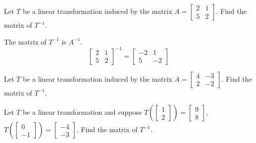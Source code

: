 \documentclass{ximera}
\begin{document}
\begin{problem}\label{prb:6.8} Let $T$ be a linear transformation induced by the matrix $A = \left[ \begin{array}{rr}
2 & 1 \\
5 & 2
\end{array} \right]$. Find the matrix of $T^{-1}$.
\begin{hint}
The matrix of $T^{-1}$ is $A^{-1}$.
\[
\left[ \begin{array}{rr}
2 & 1 \\
5 & 2
\end{array} \right] ^{-1} =
\left[
\begin{array}{rr}
-2 & 1 \\
5 & -2
\end{array}
\right]
\]
\end{hint}
\end{problem}

\begin{problem}\label{prb:6.9} Let $T$ be a linear transformation induced by the matrix $A = \left[ \begin{array}{rr}
4 & -3 \\
2 & -2
\end{array} \right]$. Find the matrix of $T^{-1}$.
\end{problem}

\begin{problem}\label{prb:6.10} Let $T$ be a linear transformation and suppose $T \left( \left[ \begin{array}{r}
1 \\
2
\end{array}\right] \right) = \left[ \begin{array}{r}
9 \\
8
\end{array} \right]$, $T \left( \left[ \begin{array}{r}
0 \\
-1
\end{array}\right] \right) = \left[ \begin{array}{r}
-4 \\
-3
\end{array}\right]$.
Find the matrix of $T^{-1}$.
\end{problem}
\end{document}

